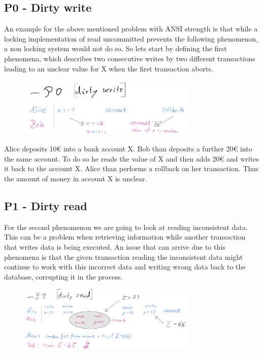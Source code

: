 \documentclass[sigconf, review=true]{acmart}
\begin{document}
\subsection{P0 - Dirty write}
An example for the above mentioned problem with ANSI strength is that while a locking implementation of read uncommitted
prevents the following phenomenon, a non locking system would not do so.
So lets start by defining the first phenomena, which describes two consecutive writes by two different
transactions leading to an unclear value for X when the first transaction aborts.

\begin{figure}[h]
    
\includegraphics[width=8.5cm]{P0}

\end{figure}

\begin{example}
    Alice deposits 10€ into a bank account X.
    Bob than deposits a further 20€ into the same account.
    To do so he reads the value of X and then adds 20€ and writes it back to the account X.
    Alice than performs a rollback on her transaction.
    Thus the amount of money in account X is unclear.
\end{example}

\subsection{P1 - Dirty read}
For the second phenomenon we are going to look at reading inconsistent data.
This can be a problem when retrieving information while another transaction
that writes data is being executed. An issue that can arrive due to this phenomena is
that the given transaction reading the inconsistent data might continue to work with this
incorrect data and writing wrong data back to the database, corrupting it in the process.


\begin{figure}[h]
    
\includegraphics[width=8.5cm]{P1}
    
\end{figure}
\end{document}
